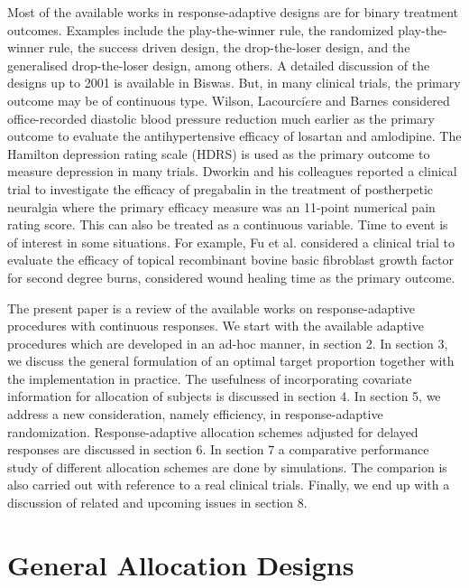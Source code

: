 Most of the available works in response-adaptive designs are for binary treatment outcomes. Examples include the play-the-winner rule\cite{15}, the randomized play-the-winner rule\cite{4}, the success driven design\cite{16}, the drop-the-loser design\cite{17}, and the generalised drop-the-loser design\cite{18}, among others. A detailed discussion of the designs up to 2001 is available in Biswas\cite{19}. But, in many clinical trials, the primary outcome may be of continuous type. Wilson, Lacourci$\grave{e}$re and Barnes\cite{20} considered office-recorded diastolic blood pressure reduction much earlier as the primary outcome to evaluate the antihypertensive efficacy of losartan and amlodipine. The Hamilton depression rating scale (HDRS) is used as the primary outcome to measure depression in many trials\cite{21,22}. Dworkin  and his colleagues\cite{23}  reported a clinical trial to investigate the efficacy of pregabalin in the treatment of postherpetic neuralgia where the primary efficacy measure was an 11-point numerical pain rating score. This can also be treated as a continuous variable\cite{24,25,26}. Time to event is of interest in some situations. For example, Fu et al.\cite{27} considered a clinical trial to evaluate the efficacy
of topical recombinant bovine basic fibroblast growth factor for second degree burns, considered wound healing time as the primary outcome.

The present paper is a review of the available works on
response-adaptive procedures with continuous responses. We start
with the available adaptive procedures which are developed in an ad-hoc manner, in section 2. In section 3, we discuss the general formulation of an optimal target proportion together with the implementation in practice. The usefulness of incorporating covariate information for allocation of subjects is discussed in section 4. In section 5, we address a new consideration, namely efficiency,  in response-adaptive randomization. Response-adaptive allocation schemes adjusted for delayed responses are discussed in section 6. In section 7 a comparative performance study of different allocation schemes are done by simulations. The comparion is also carried out with reference to a real clinical trials. Finally, we end up with a discussion of related and upcoming issues in section 8.

\section{General Allocation Designs}


